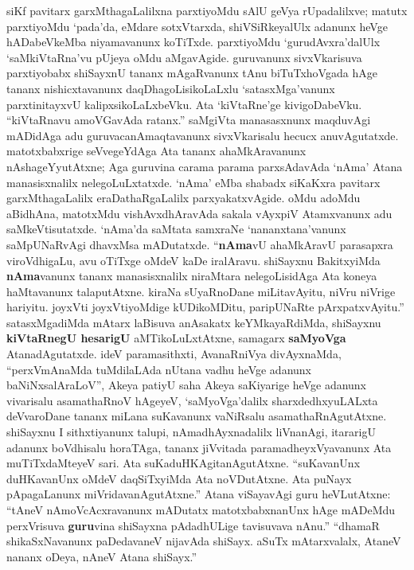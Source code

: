 siKf pavitarx garxMthagaLalilxna parxtiyoMdu sAlU geVya rUpadalilxve; matutx parxtiyoMdu `pada'da, eMdare sotxVtarxda, shiVSiRkeyalUlx adanunx heVge hADabeVkeMba niyamavanunx koTiTxde. parxtiyoMdu `gurudAvxra'dalUlx `saMkiVtaRna'vu pUjeya oMdu aMgavAgide. guruvanunx sivxVkarisuva parxtiyobabx shiSayxnU tananx mAgaRvanunx tAnu biTuTxhoVgada hAge tananx nishicxtavanunx daqDhagoLisikoLaLxlu `satasxMga'vanunx parxtinitayxvU kalipxsikoLaLxbeVku. Ata `kiVtaRne'ge kivigoDabeVku. ``kiVtaRnavu amoVGavAda ratanx.'' saMgiVta manasasxnunx maqduvAgi mADidAga adu guruvacanAmaqtavanunx sivxVkarisalu hecucx anuvAgutatxde. matotxbabxrige seVvegeYdAga Ata tananx ahaMkAravanunx nAshageYyutAtxne; Aga guruvina carama parama parxsAdavAda `nAma' Atana manasisxnalilx nelegoLuLxtatxde. `nAma' eMba shabadx siKaKxra pavitarx garxMthagaLalilx eraDathaRgaLalilx parxyakatxvAgide. oMdu adoMdu aBidhAna, matotxMdu vishAvxdhAravAda sakala vAyxpiV Atamxvanunx adu saMkeVtisutatxde. `nAma'da saMtata samxraNe `nananxtana'vanunx saMpUNaRvAgi dhavxMsa mADutatxde. ``{\bf nAma}vU ahaMkAravU parasapxra viroVdhigaLu, avu oTiTxge oMdeV kaDe iralAravu. shiSayxnu BakitxyiMda {\bf nAma}vanunx tananx manasisxnalilx niraMtara nelegoLisidAga Ata koneya haMtavanunx talaputAtxne. kiraNa sUyaRnoDane miLitavAyitu, niVru niVrige hariyitu. joyxVti joyxVtiyoMdige kUDikoMDitu, paripUNaRte pArxpatxvAyitu.'' satasxMgadiMda mAtarx laBisuva anAsakatx keYMkayaRdiMda, shiSayxnu {\bf kiVtaRnegU hesarigU} aMTikoLuLxtAtxne, samagarx {\bf saMyoVga} AtanadAgutatxde. ideV paramasithxti, AvanaRniVya divAyxnaMda, ``perxVmAnaMda tuMdilaLAda nUtana vadhu heVge adanunx baNiNxsalAraLoV'', Akeya patiyU saha Akeya saKiyarige heVge adanunx vivarisalu asamathaRnoV hAgeyeV, `saMyoVga'dalilx sharxdedhxyuLALxta deVvaroDane tananx miLana suKavanunx vaNiRsalu asamathaRnAgutAtxne. shiSayxnu I sithxtiyanunx talupi, nAmadhAyxnadalilx liVnanAgi, itararigU adanunx boVdhisalu horaTAga, tananx jiVvitada paramadheyxVyavanunx Ata muTiTxdaMteyeV sari. Ata suKaduHKAgitanAgutAtxne. ``suKavanUnx duHKavanUnx oMdeV daqSiTxyiMda Ata noVDutAtxne. Ata puNayx pApagaLanunx miVridavanAgutAtxne.'' Atana viSayavAgi guru heVLutAtxne: ``tAneV nAmoVcAcxravanunx mADutatx matotxbabxnanUnx hAge mADeMdu perxVrisuva {\bf guru}vina shiSayxna pAdadhULige tavisuvava nAnu.'' ``dhamaR shikaSxNavanunx paDedavaneV nijavAda shiSayx. aSuTx mAtarxvalalx, AtaneV nananx oDeya, nAneV Atana shiSayx.''


